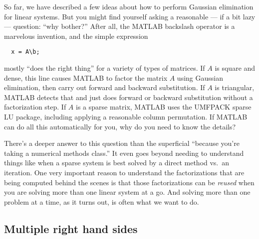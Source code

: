 \documentclass[12pt, leqno]{article}
\begin{document}
So far, we have described a few ideas about how to perform Gaussian
elimination for linear systems.  But you might find yourself asking a
reasonable --- if a bit lazy --- question: ``why bother?''  After all,
the MATLAB backslash operator is a marvelous invention, and the simple
expression
\begin{lstlisting}
  x = A\b;
\end{lstlisting}
mostly ``does the right thing'' for a variety of types of matrices.
If $A$ is square and dense, this line causes MATLAB to factor the
matrix $A$ using Gaussian elimination, then carry out forward and
backward substitution.  If $A$ is triangular, MATLAB detects that and
just does forward or backward substitution without a factorization
step.  If $A$ is a sparse matrix, MATLAB uses the UMFPACK sparse LU
package, including applying a reasonable column permutation.  If
MATLAB can do all this automatically for you, why do you need to know
the details?

There's a deeper answer to this question than the superficial
``because you're taking a numerical methods class.''  It even
goes beyond needing to understand things like when a sparse system
is best solved by a direct method vs.~an iteration.  One very
important reason to understand the factorizations that are being
computed behind the scenes is that those factorizations can be
{\em reused} when you are solving more than one linear system at a go.
And solving more than one problem at a time, as it turns out, is often
what we want to do.

\subsection*{Multiple right hand sides}
\end{document}
